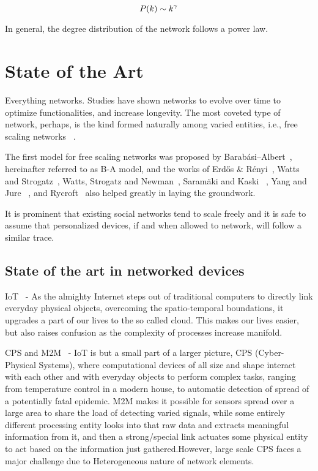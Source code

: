 \begin{equation}
P(k) \sim k^{\-\gamma}
\label{eqn:power law}
\end{equation}

In general, the degree distribution of the network follows a power law. 



\section{State of the Art}
Everything networks. Studies have shown networks to evolve over time to optimize functionalities, and increase longevity. The most coveted type of network, perhaps, is the kind formed naturally among varied entities, i.e., free scaling networks ~\cite{1999Sci...286..509B, 2002RvMP...74...47A}.

The first model for free scaling networks was proposed by Barab{\'a}si–Albert~\cite{1999Sci...286..509B}, hereinafter referred to as B-A model, and the works of Erd\H{o}s \& R\'{e}nyi~\cite{Erdos60onthe}, Watts and Strogatz~\cite{1251797}, Watts, Strogatz and Newman~\cite{PhysRevE.64.026118},  Saramäki  and Kaski~\cite{Saramaki200480} , Yang and Jure~\cite{Yang_modelinginformation} , and  Rycroft~\cite{Rycroft2007565} also helped greatly in laying the groundwork.

It is prominent that existing social networks tend to scale freely and it is safe to assume that personalized devices, if and when allowed to network, will follow a similar trace.

\subsection{State of the art in networked devices}

IoT~\cite{Internet-of-things} - As the almighty Internet steps out of traditional computers to directly link everyday physical objects, overcoming the spatio-temporal boundations, it upgrades a part of our lives to the so called cloud.
This makes our lives easier, but also raises confusion as the complexity of processes increase manifold. 

CPS and M2M~\cite{6601317} - IoT is but a small part of a larger picture, CPS (Cyber-Physical Systems), where computational devices of all size and shape interact with each other and with everyday objects to perform complex tasks, ranging from temperature control in a modern house, to automatic detection of spread of a potentially fatal epidemic.
M2M makes it possible for sensors spread over a large area to share the load of detecting varied signals, while some entirely different processing entity looks into that raw data and extracts meaningful information from it, and then a strong/special link actuates some physical entity to act based on the  information just gathered.However, large scale CPS faces a major challenge due to Heterogeneous nature of network elements.

